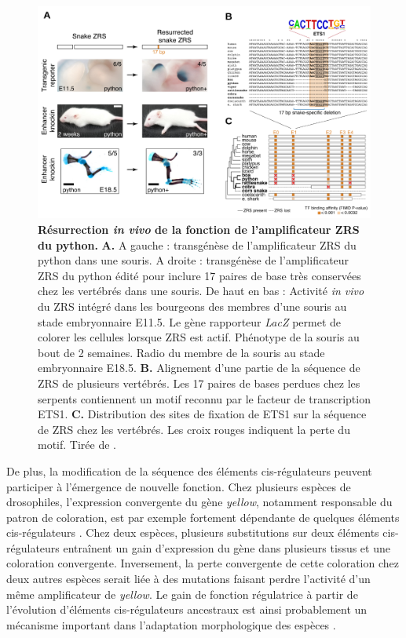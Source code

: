\begin{figure}[h]
 \centering
 \includegraphics[width=1\textwidth, page=1] {figures/introduction/fig34.png}
 \caption[Résurrection \textit{in vivo} de la fonction de l'\gls{amplificateur} \acrshort{ZRS} du python.]{
 \textbf{Résurrection \textit{in vivo} de la fonction de l'\gls{amplificateur} \acrshort{ZRS} du python.}
 \textbf{A.} A gauche : transgénèse de l'\gls{amplificateur} \acrshort{ZRS} du python dans une souris. A droite : transgénèse de l'\gls{amplificateur} \acrshort{ZRS} du python édité pour inclure 17 paires de base très conservées chez les vertébrés dans une souris. De haut en bas : Activité \textit{in vivo} du \acrshort{ZRS} intégré dans les bourgeons des membres d'une souris au stade embryonnaire E11.5. Le gène rapporteur \textit{LacZ} permet de colorer les cellules lorsque \acrshort{ZRS} est actif. Phénotype de la souris au bout de 2 semaines. Radio du membre de la souris au stade embryonnaire E18.5. 
 \textbf{B.} Alignement d'une partie de la séquence de \acrshort{ZRS} de plusieurs vertébrés. Les 17 paires de bases perdues chez les serpents contiennent un motif reconnu par le facteur de transcription ETS1. 
 \textbf{C.} Distribution des sites de fixation de ETS1 sur la séquence de \acrshort{ZRS} chez les vertébrés. Les croix rouges indiquent la perte du motif. Tirée de \citet{kvon_progressive_2016}. \\
 }
 \label{fig:Fig34}
\end{figure}

De plus, la modification de la séquence des éléments \gls{cis}-régulateurs peuvent participer à l’émergence de nouvelle fonction. Chez plusieurs espèces de drosophiles, l’expression convergente du gène \textit{yellow}, notamment responsable du patron de coloration, est par exemple fortement dépendante de quelques éléments \gls{cis}-régulateurs \citep{prudhomme_repeated_2006}. Chez deux espèces, plusieurs substitutions sur deux éléments \gls{cis}-régulateurs entraînent un gain d’expression du gène dans plusieurs tissus et une coloration convergente. Inversement, la perte convergente de cette coloration chez deux autres espèces serait liée à des mutations faisant perdre l'activité d’un même \gls{amplificateur} de \textit{yellow}. Le gain de fonction régulatrice à partir de l’évolution d’éléments \gls{cis}-régulateurs ancestraux est ainsi probablement un mécanisme important dans l’adaptation morphologique des espèces \citep{koshikawa_enhancer_2015}.

